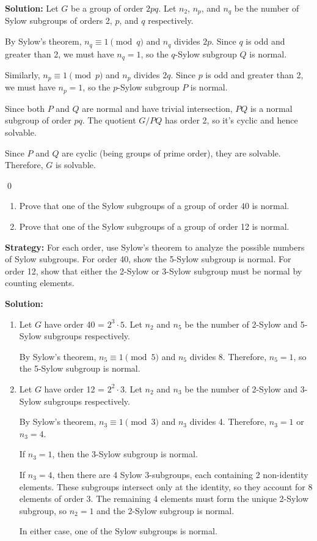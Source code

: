 \noindent\textbf{Solution:} Let $G$ be a group of order $2pq$. Let $n_2$, $n_p$, and $n_q$ be the number of Sylow subgroups of orders 2, $p$, and $q$ respectively.

By Sylow's theorem, $n_q \equiv 1 \pmod{q}$ and $n_q$ divides $2p$. Since $q$ is odd and greater than 2, we must have $n_q = 1$, so the $q$-Sylow subgroup $Q$ is normal.

Similarly, $n_p \equiv 1 \pmod{p}$ and $n_p$ divides $2q$. Since $p$ is odd and greater than 2, we must have $n_p = 1$, so the $p$-Sylow subgroup $P$ is normal.

Since both $P$ and $Q$ are normal and have trivial intersection, $PQ$ is a normal subgroup of order $pq$. The quotient $G/PQ$ has order 2, so it's cyclic and hence solvable.

Since $P$ and $Q$ are cyclic (being groups of prime order), they are solvable. Therefore, $G$ is solvable.


\qed
\begin{problembox}
\begin{enumerate}[label=(\alph*)]
\item Prove that one of the Sylow subgroups of a group of order 40 is normal.
\item Prove that one of the Sylow subgroups of a group of order 12 is normal.
\end{enumerate}
\end{problembox}

\noindent\textbf{Strategy:} For each order, use Sylow's theorem to analyze the possible numbers of Sylow subgroups. For order 40, show the 5-Sylow subgroup is normal. For order 12, show that either the 2-Sylow or 3-Sylow subgroup must be normal by counting elements.

\noindent\textbf{Solution:}
\begin{enumerate}[label=(\alph*)]
\item Let $G$ have order 40 = $2^3 \cdot 5$. Let $n_2$ and $n_5$ be the number of 2-Sylow and 5-Sylow subgroups respectively.

By Sylow's theorem, $n_5 \equiv 1 \pmod{5}$ and $n_5$ divides 8. Therefore, $n_5 = 1$, so the 5-Sylow subgroup is normal.

\item Let $G$ have order 12 = $2^2 \cdot 3$. Let $n_2$ and $n_3$ be the number of 2-Sylow and 3-Sylow subgroups respectively.

By Sylow's theorem, $n_3 \equiv 1 \pmod{3}$ and $n_3$ divides 4. Therefore, $n_3 = 1$ or $n_3 = 4$.

If $n_3 = 1$, then the 3-Sylow subgroup is normal.

If $n_3 = 4$, then there are 4 Sylow 3-subgroups, each containing 2 non-identity elements. These subgroups intersect only at the identity, so they account for 8 elements of order 3. The remaining 4 elements must form the unique 2-Sylow subgroup, so $n_2 = 1$ and the 2-Sylow subgroup is normal.

In either case, one of the Sylow subgroups is normal.
\end{enumerate}


